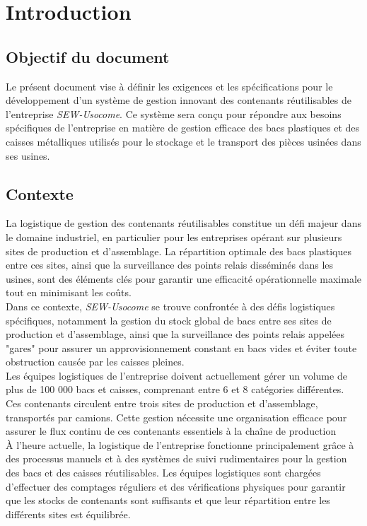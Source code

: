 \section{Introduction}

\subsection{Objectif du document}

Le présent document vise à définir les exigences et les spécifications pour le développement d'un système de gestion innovant des contenants réutilisables de l'entreprise \emph{SEW-Usocome}. Ce système sera conçu pour répondre aux besoins spécifiques de l'entreprise en matière de gestion efficace des bacs plastiques et des caisses métalliques utilisés pour le stockage et le transport des pièces usinées dans ses usines.

\subsection{Contexte}

La logistique de gestion des contenants réutilisables constitue un défi majeur dans le domaine industriel, en particulier pour les entreprises opérant sur plusieurs sites de production et d'assemblage. La répartition optimale des bacs plastiques entre ces sites, ainsi que la surveillance des points relais disséminés dans les usines, sont des éléments clés pour garantir une efficacité opérationnelle maximale tout en minimisant les coûts.\\

Dans ce contexte, \emph{SEW-Usocome} se trouve confrontée à des défis logistiques spécifiques, notamment la gestion du stock global de bacs entre ses sites de production et d'assemblage, ainsi que la surveillance des points relais appelées "gares" pour assurer un approvisionnement constant en bacs vides et éviter toute obstruction causée par les caisses pleines.\\

Les équipes logistiques de l'entreprise doivent actuellement gérer un volume de plus de 100 000 bacs et caisses, comprenant entre 6 et 8 catégories différentes. Ces contenants circulent entre trois sites de production et d'assemblage, transportés par camions. Cette gestion nécessite une organisation efficace pour assurer le flux continu de ces contenants essentiels à la chaîne de production\\

À l'heure actuelle, la logistique de l'entreprise fonctionne principalement grâce à des processus manuels et à des systèmes de suivi rudimentaires pour la gestion des bacs et des caisses réutilisables. Les équipes logistiques sont chargées d'effectuer des comptages réguliers et des vérifications physiques pour garantir que les stocks de contenants sont suffisants et que leur répartition entre les différents sites est équilibrée.\\

